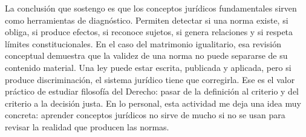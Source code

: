 \documentclass[
	spanish,
	letterpaper, oneside
]{article}
\begin{document}
La conclusión que sostengo es que los conceptos jurídicos fundamentales sirven como herramientas de diagnóstico. Permiten detectar si una norma existe, si obliga, si produce efectos, si reconoce sujetos, si genera relaciones y si respeta límites constitucionales. En el caso del matrimonio igualitario, esa revisión conceptual demuestra que la validez de una norma no puede separarse de su contenido material. Una ley puede estar escrita, publicada y aplicada, pero si produce discriminación, el sistema jurídico tiene que corregirla. Ese es el valor práctico de estudiar filosofía del Derecho: pasar de la definición al criterio y del criterio a la decisión justa. En lo personal, esta actividad me deja una idea muy concreta: aprender conceptos jurídicos no sirve de mucho si no se usan para revisar la realidad que producen las normas.


\end{document}
